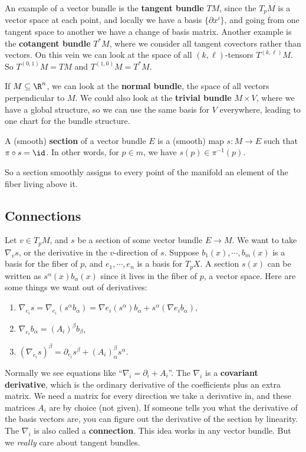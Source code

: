 \begin{example}
    An example of a vector bundle is the \textbf{tangent bundle} $TM$, since the $T_p M$ is a vector space at each point, and locally we have a basis $\{\partial x^i  \} $, and going from one tangent space to another we have a change of basis matrix. Another example is the \textbf{cotangent bundle} $T^*M$, where we consider all tangent covectors rather than vectors. On this vein we can look at the space of all $(k,\ell)$-tensors $T^{(k,\ell)}M$. So $T^{(0,1)}M=TM$ and $T^{(1,0)}M=T^*M$.

    If $M \subseteq \R^n $, we can look at the \textbf{normal bundle}, the space of all vectors perpendicular to $M$. We could also look at the \textbf{trivial bundle} $M \times V$, where we have a global structure, so we can use the same basis for $V$ everywhere, leading to one chart for the bundle structure.
\end{example}
\begin{definition}[]
    A (smooth) \textbf{section} of a vector bundle $E$ is a (smooth) map $s \colon M \to E$ such that $\pi \circ s=\id$. In other words, for $p \in m$, we have $s(p) \in \pi^{-1}(p)$.
\end{definition}
So a section smoothly assigns to every point of the manifold an element of the fiber living above it.

\subsection{Connections}
Let $v \in T_p M$, and $s$ be a section of some vector bundle $E\to M$. We want to take $\nabla_v s$, or the derivative in the $v$-direction of $s$. Suppose $b_1(x),\cdots ,b_m(x)$ is a basis for the fiber of $p$, and $e_1,\cdots ,e_n $ is a basis for $T_p X$. A section $s(x)$ can be written as $s^{\alpha }(x)b_{\alpha }(x)$ since it lives in the fiber of $p$, a vector space. Here are some things we want out of derivatives:
\begin{enumerate}[label=(\roman*)]
    \setlength\itemsep{-.2em}
\item $\nabla _{e_i }s=\nabla _{e_i }(s^{\alpha }b_{\alpha })=\nabla e_i (s^{\alpha })b_{\alpha }+s^{\alpha }(\nabla e_i b_{\alpha }),$
\item $\nabla _{e_i }b_{\alpha }=(A_i )^{\beta }b_{\beta }$,
\item $\left( \nabla _{e_i }s \right) ^{\beta }=\partial _{e_i }s^{\beta }+(A_i )_{\alpha }^{\beta }s^{\alpha }$.
\end{enumerate}
Normally we see equations like ``$\nabla _i =\partial _i +A_i $''. The $\nabla _i $ is a \textbf{covariant derivative}, which is the ordinary derivative of the coefficients plus an extra matrix. We need a matrix for every direction we take a derivative in, and these matrices $A_i $ are by choice (not given). If someone tells you what the derivative of the basis vectors are, you can figure out the derivative of the section by linearity. The $\nabla _i $ is also called a \textbf{connection}. This idea works in any vector bundle. But we \emph{really} care about tangent bundles.

